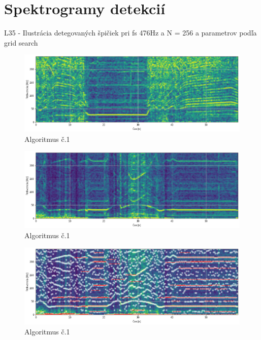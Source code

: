 \thispagestyle{empty}
\setcounter{figure}{0}
\chapter{Spektrogramy detekcií}
\renewcommand*{\thepage}{D-\arabic{page}}

L35 - Ilustrácia detegovaných špičiek pri fs 476Hz a N = 256 a parametrov podľa grid search
\begin{figure}[h]
	\centering
    \includegraphics[width=\textwidth]{figures/verification/L83-dataset-spectrum.png}
    \caption{Algoritmus č.1}
\end{figure}

\begin{figure}[h]
	\centering
    \includegraphics[width=\textwidth]{figures/verification/L35-dataset-spectrum.png}
    \caption{Algoritmus č.1}
\end{figure}

\begin{figure}[h]
	\centering
    \includegraphics[width=\textwidth]{figures/verification/L35-dataset-A1.png}
    \caption{Algoritmus č.1}
\end{figure}

